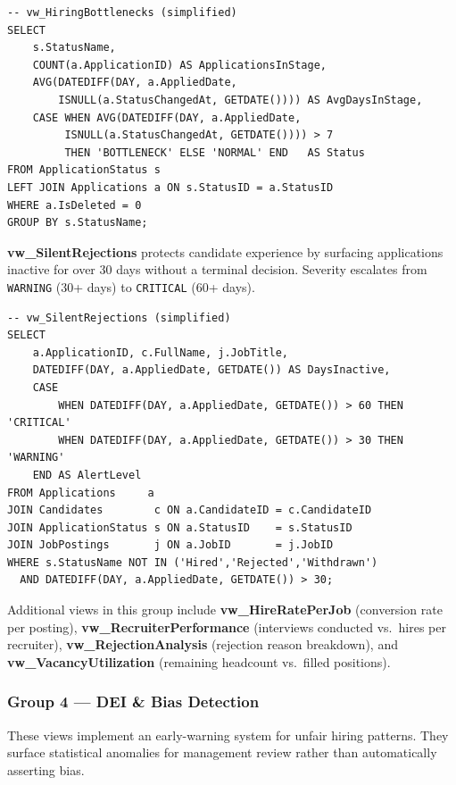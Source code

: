 \documentclass[11pt,a4paper]{article}
\begin{document}
\begin{verbatim}
-- vw_HiringBottlenecks (simplified)
SELECT
    s.StatusName,
    COUNT(a.ApplicationID) AS ApplicationsInStage,
    AVG(DATEDIFF(DAY, a.AppliedDate,
        ISNULL(a.StatusChangedAt, GETDATE()))) AS AvgDaysInStage,
    CASE WHEN AVG(DATEDIFF(DAY, a.AppliedDate,
         ISNULL(a.StatusChangedAt, GETDATE()))) > 7
         THEN 'BOTTLENECK' ELSE 'NORMAL' END   AS Status
FROM ApplicationStatus s
LEFT JOIN Applications a ON s.StatusID = a.StatusID
WHERE a.IsDeleted = 0
GROUP BY s.StatusName;
\end{verbatim}

\textbf{vw\_SilentRejections} protects candidate experience by surfacing applications inactive for over 30 days without a terminal decision. Severity escalates from \texttt{WARNING} (30+ days) to \texttt{CRITICAL} (60+ days).

\begin{verbatim}
-- vw_SilentRejections (simplified)
SELECT
    a.ApplicationID, c.FullName, j.JobTitle,
    DATEDIFF(DAY, a.AppliedDate, GETDATE()) AS DaysInactive,
    CASE
        WHEN DATEDIFF(DAY, a.AppliedDate, GETDATE()) > 60 THEN 'CRITICAL'
        WHEN DATEDIFF(DAY, a.AppliedDate, GETDATE()) > 30 THEN 'WARNING'
    END AS AlertLevel
FROM Applications     a
JOIN Candidates        c ON a.CandidateID = c.CandidateID
JOIN ApplicationStatus s ON a.StatusID    = s.StatusID
JOIN JobPostings       j ON a.JobID       = j.JobID
WHERE s.StatusName NOT IN ('Hired','Rejected','Withdrawn')
  AND DATEDIFF(DAY, a.AppliedDate, GETDATE()) > 30;
\end{verbatim}

Additional views in this group include \textbf{vw\_HireRatePerJob} (conversion rate per posting), \textbf{vw\_RecruiterPerformance} (interviews conducted vs.\ hires per recruiter), \textbf{vw\_RejectionAnalysis} (rejection reason breakdown), and \textbf{vw\_VacancyUtilization} (remaining headcount vs.\ filled positions).

\subsubsection{Group 4 — DEI \& Bias Detection}

These views implement an early-warning system for unfair hiring patterns. They surface statistical anomalies for management review rather than automatically asserting bias.
\end{document}
